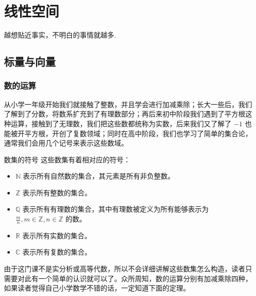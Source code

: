\chapter{线性空间}
\begin{center}
	\textcolor[RGB]{255, 0, 0}{\faHeart}越想贴近事实，不明白的事情就越多.\textcolor[RGB]{255, 0, 0}{\faHeart}
\end{center}
\vspace{-5pt}
\begin{center}
\end{center}

\section{标量与向量}

\subsection{数的运算}

从小学一年级开始我们就接触了整数，并且学会进行加减乘除；长大一些后，我们了解到了分数，将数系扩充到了有理数部分；再后来初中阶段我们遇到了平方根这种运算，接触到了无理数，我们把这些数都统称为实数，后来我们又了解了 $-1$ 也能被开平方根，开创了复数领域；同时在高中阶段，我们也学习了简单的集合论，通常我们会用几个记号来表示这些数域。

\begin{definition}{数集的符号}
	这些数集有着相对应的符号：
	\begin{itemize}
		\item $\mathbb{N}$ 表示所有自然数的集合，其元素是所有非负整数。
		\item $\mathbb{Z}$ 表示所有整数的集合。
		\item $\mathbb{Q}$ 表示所有有理数的集合，其中有理数被定义为所有能够表示为 $\frac{m}{n},m\in \mathbb{Z},n\in \mathbb{Z}$ 的数。
		\item $\mathbb{R}$ 表示所有实数的集合。
		\item $\mathbb{C}$ 表示所有复数的集合。
	\end{itemize}
\end{definition}

由于这门课不是实分析或高等代数，所以不会详细讲解这些数集怎么构造，读者只需要对此有一个简单的认识就可以了。众所周知，数的运算分别有加减乘除四种，如果读者觉得自己小学数学不错的话，一定知道下面的定理。

